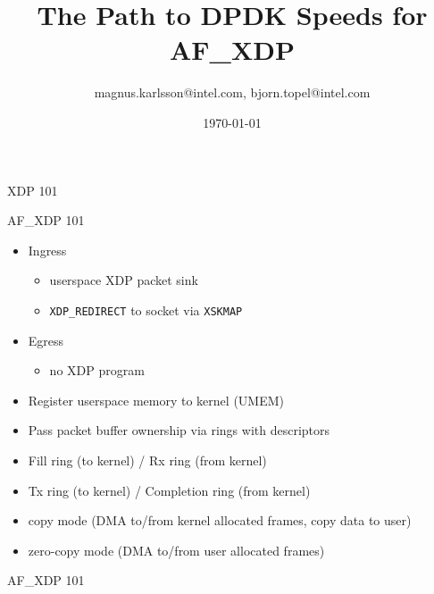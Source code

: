 \documentclass{beamer}
\title{The Path to DPDK Speeds for AF\_XDP}
\date{\today}
\author{magnus.karlsson@intel.com, bjorn.topel@intel.com}
\institute{LPC 2018}
\begin{document}
  \maketitle

  \begin{frame}{XDP 101}
    \resizebox{\textwidth}{!}{}
  \end{frame}
  \begin{frame}{AF\_XDP 101}
    \begin{itemize}
    \item Ingress
      \begin{itemize}
      \item userspace XDP packet sink
      \item {\tt XDP\_REDIRECT} to socket via {\tt XSKMAP}
      \end{itemize}
    \item Egress
      \begin{itemize}
      \item no XDP program
      \end{itemize}
    \item Register userspace memory to kernel (UMEM)
    \item Pass packet buffer ownership via rings with descriptors
    \item Fill ring (to kernel) / Rx ring (from kernel)
    \item Tx ring (to kernel) / Completion ring (from kernel)
    \item copy mode (DMA to/from kernel allocated frames, copy data to user)
    \item zero-copy mode (DMA to/from user allocated frames)
    \end{itemize}
  \end{frame}
  \begin{frame}{AF\_XDP 101}
    \resizebox{\textwidth}{!}{}
  \end{frame}
\end{document}
